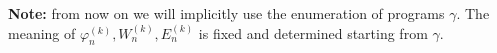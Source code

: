 \textbf{Note:} from now on we will implicitly use the enumeration of
programs $\gamma$. The meaning of
$\varphi_n^{(k)}, W_n^{(k)}, E_n^{(k)}$ is fixed and determined
starting from $\gamma$.







